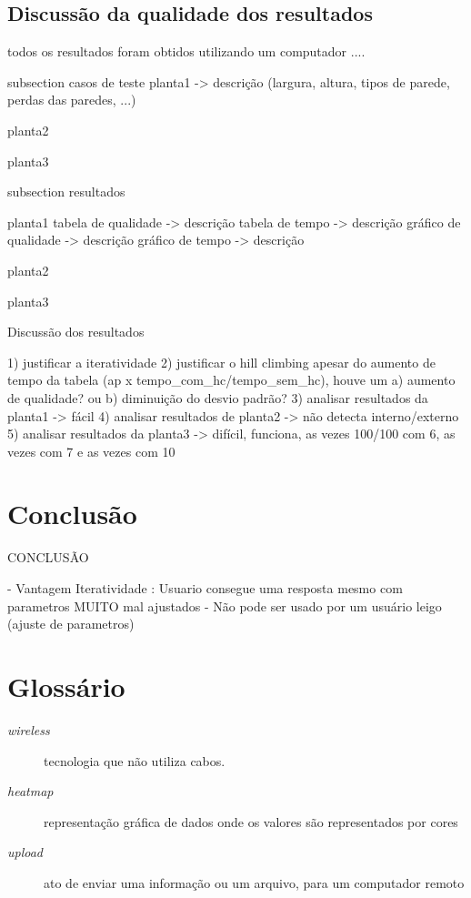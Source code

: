 \documentclass[tc,twoside]{iiufrgs}
\begin{document}
\section{Discussão da qualidade dos resultados}

todos os resultados foram obtidos utilizando um computador ....

subsection casos de teste
planta1 -> descrição (largura, altura, tipos de parede, perdas das paredes, ...)

planta2

planta3

subsection resultados

planta1
tabela de qualidade -> descrição
tabela de tempo -> descrição
gráfico de qualidade -> descrição
gráfico de tempo -> descrição

planta2

planta3



Discussão dos resultados

1) justificar a iteratividade
2) justificar o hill climbing apesar do aumento de tempo da tabela (ap x tempo_com_hc/tempo_sem_hc), houve um a) aumento de qualidade? ou b) diminuição do desvio padrão?
3) analisar resultados da planta1 -> fácil
4) analisar resultados de planta2 -> não detecta interno/externo
5) analisar resultados da planta3 -> difícil, funciona, as vezes 100/100 com 6, as vezes com 7 e as vezes com 10

\chapter{Conclusão} 

CONCLUSÃO

- Vantagem Iteratividade : Usuario consegue uma resposta mesmo com parametros MUITO mal ajustados
- Não pode ser usado por um usuário leigo (ajuste de parametros)



 

\chapter*{Glossário} 

\begin{description} 
	\item[\textit{wireless}] tecnologia que não utiliza cabos.
	\item[\textit{heatmap}] representação gráfica de dados onde os valores são representados por cores
	\item[\textit{upload}] ato de enviar uma informação ou um arquivo, para um computador remoto
\end{description} 


\end{document}
